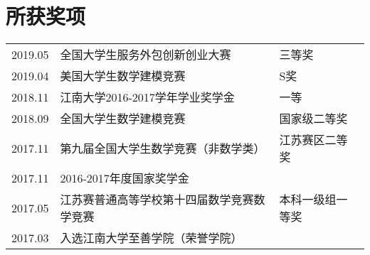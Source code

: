 \documentclass[]{deedy-resume-openfont}
\begin{document}
\begin{minipage}[t]{0.73\textwidth}

	\section{所获奖项}
    \begin{tabular}{lll}
        2019.05 & 全国大学生服务外包创新创业大赛 & 三等奖 \\
        2019.04 & 美国大学生数学建模竞赛 & S奖 \\
        2018.11 & 江南大学2016-2017学年学业奖学金 & 一等 \\
        2018.09 & 全国大学生数学建模竞赛 & 国家级二等奖 \\
        2017.11 & 第九届全国大学生数学竞赛（非数学类） & 江苏赛区二等奖 \\
        2017.11 & 2016-2017年度国家奖学金 & \\
        2017.05 & 江苏赛普通高等学校第十四届数学竞赛数学竞赛 & 本科一级组一等奖\\
        2017.03 & 入选江南大学至善学院（荣誉学院）& \\
	\end{tabular}
\end{minipage}
\end{document}
